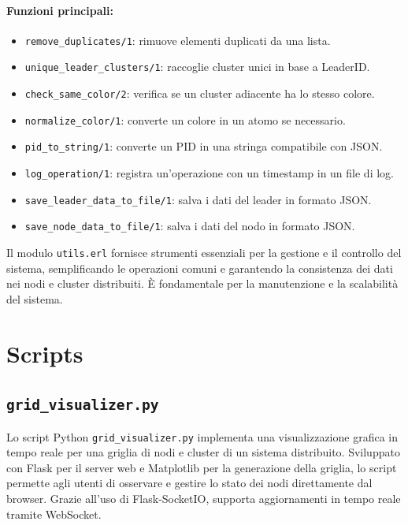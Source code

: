 \documentclass[12pt, a4paper]{report}
\begin{document}
\paragraph{Funzioni principali:}
\begin{itemize}
    \item \texttt{remove\_duplicates/1}: rimuove elementi duplicati da una lista.
    \item \texttt{unique\_leader\_clusters/1}: raccoglie cluster unici in base a LeaderID.
    \item \texttt{check\_same\_color/2}: verifica se un cluster adiacente ha lo stesso colore.
    \item \texttt{normalize\_color/1}: converte un colore in un atomo se necessario.
    \item \texttt{pid\_to\_string/1}: converte un PID in una stringa compatibile con JSON.
    \item \texttt{log\_operation/1}: registra un'operazione con un timestamp in un file di log.
    \item \texttt{save\_leader\_data\_to\_file/1}: salva i dati del leader in formato JSON.
    \item \texttt{save\_node\_data\_to\_file/1}: salva i dati del nodo in formato JSON.
\end{itemize}

\noindent
Il modulo \texttt{utils.erl} fornisce strumenti essenziali per la gestione e il controllo del sistema, semplificando le operazioni comuni e garantendo la consistenza dei dati nei nodi e cluster distribuiti. \`E fondamentale per la manutenzione e la scalabilità del sistema.

\section{Scripts}\label{sec:scripts}

\subsection{\texttt{grid\_visualizer.py}}

Lo script Python \texttt{grid\_visualizer.py} implementa una visualizzazione grafica in tempo reale per una griglia di nodi e cluster di un sistema distribuito. Sviluppato con Flask per il server web e Matplotlib per la generazione della griglia, lo script permette agli utenti di osservare e gestire lo stato dei nodi direttamente dal browser. Grazie all'uso di Flask-SocketIO, supporta aggiornamenti in tempo reale tramite WebSocket.
\end{document}

